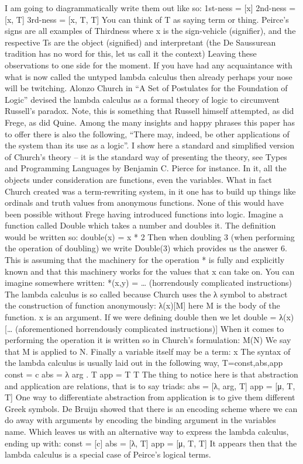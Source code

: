 \documentclass[dah,phd,a4paper]{xe_uccthesis}
\begin{document}
I am going to diagrammatically write them out like so:
1st-ness = [x]
2nd-ness = [x, T]
3rd-ness = [x, T, T]
You can think of T as saying term or thing. Peirce's signs are all examples of Thirdness where x is the sign-vehicle (signifier), and the respective Ts are the object (signified) and interpretant (the De Saussurean tradition has no word for this, let us call it the context)
	Leaving these observations to one side for the moment. If you have had any acquaintance with what is now called the untyped lambda calculus then already perhaps your nose will be twitching. Alonzo Church in “A Set of Postulates for the Foundation of Logic” devised the lambda calculus as a formal theory of logic to circumvent Russell's paradox. Note, this is something that Russell himself attempted, as did Frege, as did Quine.
	Among the many insights and happy phrases this paper has to offer there is also the following, “There may, indeed, be other applications of the system than its use as a logic”. I show here a standard and simplified version of Church's theory – it is the standard way of presenting the theory, see Types and Programming Languages by Benjamin C. Pierce for instance. In it, all the objects under consideration are functions, even the variables. What in fact Church created was a term-rewriting system, in it one has to build up things like ordinals and truth values from anonymous functions. None of this would have been possible without Frege having introduced functions into logic.
	Imagine a function called Double which takes a number and doubles it. The definition would be written so:
double(x) = x * 2
Then when doubling 3 (when performing the operation of doubling) we write Double(3) which provides us the answer 6. This is assuming that the machinery for the operation * is fully and explicitly known and that this machinery works for the values that x can take on. You can imagine somewhere written:
*(x,y) = … (horrendously complicated instructions)
	The lambda calculus is so called because Church uses the λ symbol to abstract the construction of function anonymously:
λ(x)[M]
here M is the body of the function. x is an argument. If we were defining double then we 
let double = λ(x)[… (aforementioned horrendously complicated instructions)]
When it comes to performing the operation it is written so in Church's formulation:
{M}(N)
We say that M is applied to N. Finally a variable itself may be a term:
x
The syntax of the lambda calculus is usually laid out in the following way, T={const,abs,app}
const = c
abs = λ arg . T
app = T T
The thing to notice here is that abstraction and application are relations, that is to say triads:
abs = [λ, arg, T]
app = [μ, T, T]
One way to differentiate abstraction from application is to give them different Greek symbols. De Bruijn showed that there is an encoding scheme where we can do away with arguments by encoding the binding argument in the variables name. Which leaves us with an alternative way to express the lambda calculus, ending up with:
const = [c]
abs = [λ, T]
app = [μ, T, T]
It appears then that the lambda calculus is a special case of Peirce's logical terms.
\end{document}
